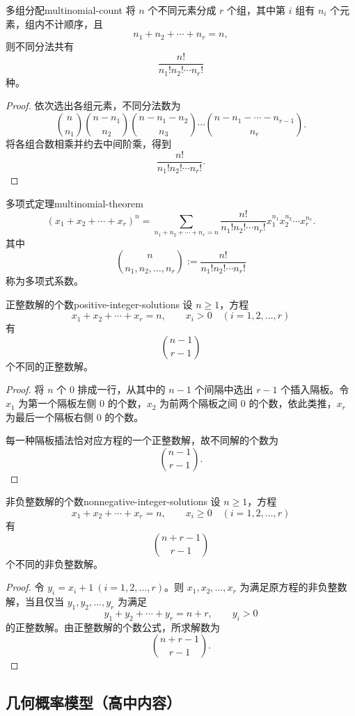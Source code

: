 \begin{proposition}{多组分配}{multinomial-count}
将 $n$ 个不同元素分成 $r$ 个组，其中第 $i$ 组有 $n_i$ 个元素，组内不计顺序，且
\[
n_1+n_2+\cdots+n_r=n,
\]
则不同分法共有
\[
\dfrac{n!}{n_1!n_2!\cdots n_r!}
\]
种。
\end{proposition}

\begin{proof}
依次选出各组元素，不同分法数为
\[
\binom{n}{n_1}
\binom{n-n_1}{n_2}
\binom{n-n_1-n_2}{n_3}
\cdots
\binom{n-n_1-\cdots-n_{r-1}}{n_r}.
\]
将各组合数相乘并约去中间阶乘，得到
\[
\dfrac{n!}{n_1!n_2!\cdots n_r!}.
\]
\end{proof}

\begin{mycorollary}{多项式定理}{multinomial-theorem}
\[
(x_1+x_2+\cdots+x_r)^n
=\sum_{n_1+n_2+\cdots+n_r=n}
\dfrac{n!}{n_1!n_2!\cdots n_r!}
x_1^{n_1}x_2^{n_2}\cdots x_r^{n_r}.
\]
其中
\[
\binom{n}{n_1,n_2,\ldots,n_r}
:=\dfrac{n!}{n_1!n_2!\cdots n_r!}
\]
称为多项式系数。
\end{mycorollary}
\newpage
\begin{proposition}{正整数解的个数}{positive-integer-solutions}
设 $n\geq1$，方程
\[
x_1+x_2+\cdots+x_r=n,\qquad x_i>0\quad(i=1,2,\ldots,r)
\]
有
\[
\binom{n-1}{r-1}
\]
个不同的正整数解。
\end{proposition}

\begin{proof}
将 $n$ 个 $0$ 排成一行，从其中的 $n-1$ 个间隔中选出 $r-1$ 个插入隔板。令 $x_1$ 为第一个隔板左侧 $0$ 的个数，$x_2$ 为前两个隔板之间 $0$ 的个数，依此类推，$x_r$ 为最后一个隔板右侧 $0$ 的个数。

每一种隔板插法恰对应方程的一个正整数解，故不同解的个数为
\[
\binom{n-1}{r-1}.
\]
\end{proof}

\begin{proposition}{非负整数解的个数}{nonnegative-integer-solutions}
设 $n\geq1$，方程
\[
x_1+x_2+\cdots+x_r=n,\qquad x_i\geq0\quad(i=1,2,\ldots,r)
\]
有
\[
\binom{n+r-1}{r-1}
\]
个不同的非负整数解。
\end{proposition}

\begin{proof}
令 $y_i=x_i+1\ (i=1,2,\ldots,r)$。则 $x_1,x_2,\ldots,x_r$ 为满足原方程的非负整数解，当且仅当 $y_1,y_2,\ldots,y_r$ 为满足
\[
y_1+y_2+\cdots+y_r=n+r,\qquad y_i>0
\]
的正整数解。由正整数解的个数公式，所求解数为
\[
\binom{n+r-1}{r-1}.
\]
\end{proof}

\subsection*{几何概率模型（高中内容）}

